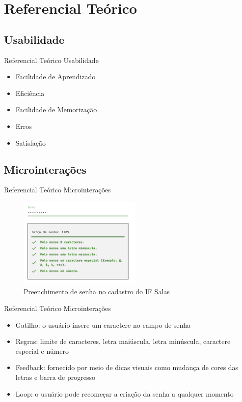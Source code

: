 \AtBeginSection[]{
	\begin{frame}
		\frametitle{}
		\tableofcontents[currentsection]
	\end{frame}
}

\section{Referencial Teórico}

\subsection{Usabilidade}
\begin{frame}{Referencial Teórico}
	{Usabilidade}
	\begin{itemize}[<+->]
		\item Facilidade de Aprendizado
		\item Eficiência
		\item Facilidade de Memorização
		\item Erros
		\item Satisfação
	\end{itemize}
\end{frame}

\subsection{Microinterações}
\begin{frame}{Referencial Teórico}
	{Microinterações}
	\begin{figure}
		\includegraphics[width=6cm]{images/senha.png}
		\caption{Preenchimento de senha no cadastro do IF Salas}
	\end{figure}
\end{frame}

\begin{frame}{Referencial Teórico}
	{Microinterações}
	\begin{itemize}[<+->]
		\item Gatilho: o usuário insere um caractere no campo de senha
		\item Regras: limite de caracteres, letra maiúscula, letra minúscula, caractere especial e número
		\item Feedback: fornecido por meio de dicas visuais como mudança de cores das letras e barra de progresso
		\item Loop: o usuário pode recomeçar a criação da senha a qualquer momento
	\end{itemize}
\end{frame}
